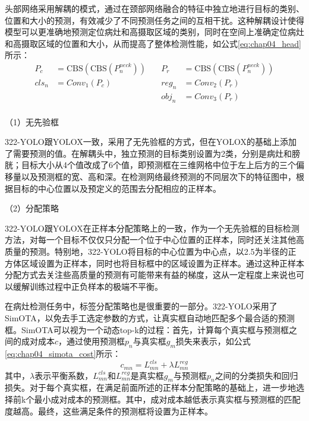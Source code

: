 头部网络采用解耦的模式，通过在颈部网络融合的特征中独立地进行目标的类别、位置和大小的预测，有效减少了不同预测任务之间的互相干扰。这种解耦设计使得模型可以更准确地预测定位病灶和高摄取区域的类别，同时在空间上准确定位病灶和高摄取区域的位置和大小，从而提高了整体检测性能，如公式\ref{eq:chap04_head}所示：
\begin{equation}
  \begin{aligned}
    P_c   & = \text{CBS}(\text{CBS}(P_n^{neck})) & \quad P_r   & = \text{CBS}(\text{CBS}(P_n^{neck})) \\
    cls_n & = Conv_1(P_c)                        & \quad reg_n & = Conv_2(P_r)                        \\
          &                                      & \quad obj_n & = Conv_3(P_r)                        \\
  \end{aligned}
  \label{eq:chap04_head}
\end{equation}

（1）无先验框

322-YOLO跟YOLOX一致，采用了无先验框的方式，但在YOLOX的基础上添加了需要预测的值。在解耦头中，独立预测的目标类别设置为2类，分别是病灶和膀胱；目标大小从4个值改成了6个值，即预测框在三维网格中位于左上后方的三个偏移量以及预测框的宽、高和深。在检测网络最终预测的不同层次下的特征图中，根据目标的中心位置以及预定义的范围去分配相应的正样本。

（2）分配策略

322-YOLO跟YOLOX在正样本分配策略上的一致，作为一个无先验框的目标检测方法，对每一个目标不仅仅只分配一个位于中心位置的正样本，同时还关注其他高质量的预测。特别地，322-YOLO将目标的中心位置为中心点，以2.5为半径的正方体区域设置为正样本，同时也将目标框中的区域设置为正样本。通过这种正样本分配方式去关注些高质量的预测有可能带来有益的梯度，这从一定程度上来说也可以缓解训练过程中正负样本的极端不平衡。

在病灶检测任务中，标签分配策略也是很重要的一部分。322-YOLO采用了SimOTA\cite{ge2021yolox}，以免去手工选定参数的方式，让真实框自动地匹配多个最合适的预测框。SimOTA可以视为一个动态top-k的过程：首先，计算每个真实框与预测框之间的成对成本\(c\)，通过使用预测框\(p_n\)与真实框\(g_m\)损失来表示，如公式\ref{eq:chap04_simota_cost}所示：
\begin{equation}
  c_{mn} = L^{cls}_{mn} + \lambda L^{reg}_{mn}
  \label{eq:chap04_simota_cost}
\end{equation}
其中，\(\lambda\)表示平衡系数，\(L^{cls}_{mn}\)和\(L^{reg}_{mn}\)是真实框\(g_m\)与预测框\(p_n\)之间的分类损失和回归损失。对于每个真实框，在满足前面所述的正样本分配策略的基础上，进一步地选择前k个最小成对成本的预测框。其中，成对成本越低表示真实框与预测框的匹配度越高。最终，这些满足条件的预测框将设置为正样本。

